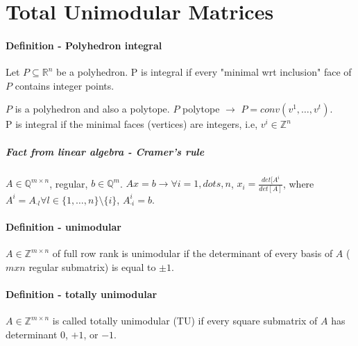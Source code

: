 \documentclass[main]{subfiles}
\begin{document}

\section{Total Unimodular Matrices}

\paragraph{Definition - Polyhedron integral} Let $P \subseteq \mathbb{R}^{n}$
be a polyhedron. P is integral if every "minimal wrt inclusion" face of $P$
contains integer points.

$P$ is a polyhedron and also a polytope. $P$ polytope $\rightarrow$ $P = 
conv(v^{1}, \dots, v^{t})$.\\
P is integral if the minimal faces (vertices) are integers, i.e, $v^{i} \in 
\mathbb{Z}^{n}$

\subparagraph{Fact from linear algebra - Cramer's rule}
$A \in \mathbb{Q}^{m \times n}$, regular, $b \in \mathbb{Q}^{m}$. $Ax = b 
\rightarrow \forall i = 1, dots, n$, $x_{i} = \frac{det[A^{i}}{det[A]}$, where
$A^{i} = A_{\cdot l} \forall l \in \{1, \dots, n \} \setminus \{i\}$, $A^{i}
_{\cdot i} = b$.

\paragraph{Definition - unimodular}
$A \in \mathbb{Z}^{m \times n}$ of full row rank is unimodular if the
determinant of every basis of $A$ ($mxn$ regular submatrix) is equal to
$\pm 1$.

\paragraph{Definition - totally unimodular}
$A \in \mathbb{Z}^{m \times n}$ is called totally unimodular (TU) if every
square submatrix of $A$ has determinant $0$, $+1$, or $-1$.
\end{document}
